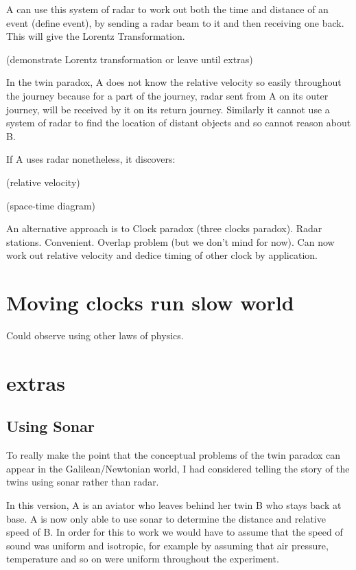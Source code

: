 \documentclass{report}
\begin{document}
A can use this system of radar to work out both the time and distance of an event (define event), by sending a radar beam to it and then receiving one back. This will give the Lorentz Transformation.

(demonstrate Lorentz transformation or leave until extras)

In the twin paradox, A does not know the relative velocity so easily throughout the journey because for a part of the journey, radar sent from A on its outer journey, will be received by it on its return journey. Similarly it cannot use a system of radar to find the location of distant objects and so cannot reason about B.

If A uses radar nonetheless, it discovers:

(relative velocity)

(space-time diagram)

An alternative approach is to  Clock paradox (three clocks paradox). Radar stations. Convenient. Overlap problem (but we don't mind for now). Can now work out relative velocity and dedice timing of other clock by application.



\section*{Moving clocks run slow world}
Could observe using other laws of physics.
\section*{extras}


\subsection*{Using Sonar}
To really make the point that the conceptual problems of the twin paradox can appear in the Galilean/Newtonian world, I had considered telling the story of the twins using sonar rather than radar.

In this version, A is an aviator who leaves behind her twin B who stays back at base. A is now only able to use sonar to determine the distance and relative speed of B. In order for this to work we would have to assume that the speed of sound was uniform and isotropic, for example by assuming that air pressure, temperature and so on were uniform throughout the experiment.
\end{document}
